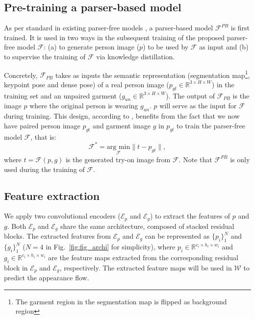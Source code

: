 \documentclass[10pt,twocolumn,letterpaper]{article}
\begin{document}
\subsection{Pre-training a parser-based model}

As per standard in existing parser-free models \cite{issenhuth2020not, ge2021parser}, a parser-based model $\mathcal{F}^{PB}$ is first trained. It is used in two ways in the subsequent training of the proposed parser-free model $\mathcal{F}$: (a) to generate  person image ($p$) to be used by $\mathcal{F}$ as input and (b) to supervise the training of $\mathcal{F}$ via knowledge distillation.

Concretely, $\mathcal{F}_{PB}$ takes as inputs the semantic representation (segmentation map\footnote{The garment region in the segmentation map is flipped as background region}, keypoint pose and dense pose) of a real person image ($p_{gt} \in \mathbb{R}^{3 \times H \times W}$) in the training set and an unpaired garment ($g_{un} \in \mathbb{R}^{3 \times H \times W}$). The output of $\mathcal{F}_{PB}$ is the image $p$ where the original person is wearing $g_{un}$. $p$ will serve as the input for $\mathcal{F}$ during training.  This design, according to \cite{ge2021parser}, benefits from the fact that we now have  paired person image $p_{gt}$ and garment image $g$ in $p_{gt}$ to train the parser-free model $\mathcal{F}$, that is:
\begin{equation}
    \mathcal{F}^{*} = \underset{\mathcal{F}}{\text{arg min}} \lVert t - p_{gt}\rVert,
\end{equation}
where $t = \mathcal{F}(p,g)$ is the generated try-on image from $\mathcal{F}$. Note that $\mathcal{F}^{PB}$ is only used during the training of $\mathcal{F}$.

\subsection{Feature extraction}

We apply two convolutional encoders ($\mathcal{E}_{p}$ and $\mathcal{E}_{g}$) to extract the features of $p$ and $g$. Both $\mathcal{E}_{p}$ and $\mathcal{E}_{g}$ share the same architecture, composed of stacked residual blocks. The extracted features from $\mathcal{E}_{p}$ and $\mathcal{E}_{g}$ can be represented as $\{p_{i}\}_{1}^{N}$ and $\{g_{i}\}_{1}^{N}$ ($N=4$ in Fig.~\ref{fig:fig_archi} for simplicity), where $p_{i} \in \mathbb{R}^{c_{i} \times h_{i} \times w_{i}}$ and $g_{i} \in \mathbb{R}^{c_{i} \times h_{i} \times w_{i}}$ are the feature maps extracted from the corresponding residual block in $\mathcal{E}_{p}$ and $\mathcal{E}_{g}$, respectively. The extracted feature maps will be used in $\mathcal{W}$ to predict the appearance flow.
\end{document}
